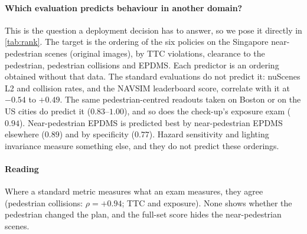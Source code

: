 

\paragraph{Which evaluation predicts behaviour in another domain?}
This is the question a deployment decision has to answer, so we pose it directly in \cref{tab:rank}.
The target is the ordering of the six policies on the Singapore near-pedestrian scenes (original images),
by TTC violations, clearance to the pedestrian, pedestrian collisions and EPDMS. Each predictor is an
ordering obtained without that data. The standard evaluations do not predict it: nuScenes L2 and
collision rates, and the NAVSIM leaderboard score, correlate with it at $-0.54$ to $+0.49$. The same
pedestrian-centred readouts taken on Boston or on the US cities do predict it ($0.83$--$1.00$), and so
does the check-up's exposure exam ($0.94$). Near-pedestrian EPDMS is predicted best by near-pedestrian
EPDMS elsewhere ($0.89$) and by specificity ($0.77$). Hazard sensitivity and lighting invariance measure
something else, and they do not predict these orderings.

\paragraph{Reading}
Where a standard metric measures what an exam measures, they agree (pedestrian collisions: $\rho=+0.94$;
TTC and exposure). None shows whether the pedestrian changed the plan, and the full-set score hides the
near-pedestrian scenes.
